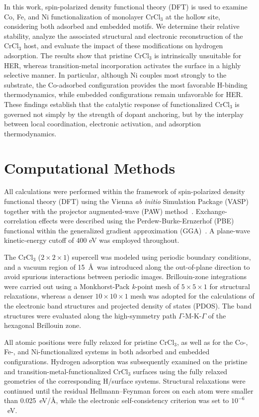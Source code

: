 \documentclass[a4paper,fleqn]{cas-dc}
\begin{document}
In this work, spin-polarized density functional theory (DFT) is used to examine Co, Fe, and Ni functionalization of monolayer CrCl$_3$ at the hollow site, considering both adsorbed and embedded motifs. We determine their relative stability, analyze the associated structural and electronic reconstruction of the CrCl$_3$ host, and evaluate the impact of these modifications on hydrogen adsorption.
The results show that pristine CrCl$_3$ is intrinsically unsuitable for HER, whereas transition-metal incorporation activates the surface in a highly selective manner.
In particular, although Ni couples most strongly to the substrate, the Co-adsorbed configuration provides the most favorable H-binding thermodynamics, while embedded configurations remain unfavorable for HER. These findings establish that the catalytic response of functionalized CrCl$_3$ is governed not simply by the strength of dopant anchoring, but by the interplay between local coordination, electronic activation, and adsorption thermodynamics.

\section{Computational Methods}

All calculations were performed within the framework of spin-polarized density functional theory (DFT) using the Vienna \textit{ab initio} Simulation Package (VASP)~\cite{Kresse1996CMS,Kresse1996PRB} together with the projector augmented-wave (PAW) method~\cite{Blochl1994,Kresse1999}. Exchange-correlation effects were described using the Perdew-Burke-Ernzerhof (PBE) functional within the generalized gradient approximation (GGA)~\cite{PhysRevLett.77.3865}. A plane-wave kinetic-energy cutoff of 400 eV was employed throughout.

The CrCl$_3$ ($2 \times 2 \times 1$) supercell was modeled using periodic boundary conditions, and a vacuum region of 15~\AA\ was introduced along the out-of-plane direction to avoid spurious interactions between periodic images. Brillouin-zone integrations were carried out using a Monkhorst-Pack \cite{Monkhorst1976} \textit{k}-point mesh of $5 \times 5 \times 1$ for structural relaxations, whereas a denser $10 \times 10 \times 1$ mesh was adopted for the calculations of the electronic band structures and projected density of states (PDOS). The band structures were evaluated along the high-symmetry path $\Gamma$-M-K-$\Gamma$ of the hexagonal Brillouin zone.

All atomic positions were fully relaxed for pristine CrCl$_3$, as well as for the Co-, Fe-, and Ni-functionalized systems in both adsorbed and embedded configurations. Hydrogen adsorption was subsequently examined on the pristine and transition-metal-functionalized CrCl$_3$ surfaces using the fully relaxed geometries of the corresponding H/surface systems. Structural relaxations were continued until the residual Hellmann--Feynman forces on each atom were smaller than 0.025~eV/\AA, while the electronic self-consistency criterion was set to $10^{-6}$~eV.
\end{document}
